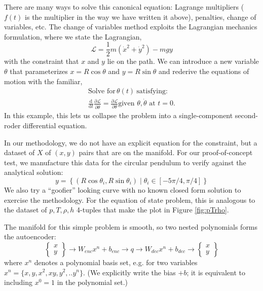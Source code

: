 \documentclass[]{article}
\begin{document}
There are many ways to solve this canonical equation: Lagrange
multipliers (\(f(t)\) is the multiplier in the way we have written it
above), penalties, change of variables, etc. The change of variables
method exploits the Lagrangian mechanics formulation, where we state
the Lagrangian,
\begin{equation}
\mathcal{L} = \frac{1}{2}m\left(\dot{x}^2 + \dot{y}^2\right) - m g y
\end{equation}
with the constraint that \(x\) and \(y\) lie on the path.
We can introduce a new variable \(\theta\) that parameterizes
\(x=R\cos\theta\) and \(y=R\sin\theta\) and rederive the equations of
motion with the familiar,
\begin{align}
\text{Solve for}\, \theta(t) \ \text{satisfying:} \nonumber \\
\frac{\mathrm{d}}{\mathrm{d}t} \frac{\partial \mathcal{L}}{\partial
  \dot{\theta}} =
  \frac{\partial \mathcal{L}}{\partial \theta}
   \text{given } \theta,\dot{\theta} \text{ at } t=0. \nonumber
\end{align}
In this example, this lets us collapse the problem into a
single-component second-roder differential equation.

In our methodology, we do not have an explicit equation for the
constraint, but a dataset of $X$ of $(x,y)$ pairs that are on the manifold. For
our proof-of-concept test, we manufacture this data for the circular
pendulum to verify against the analytical solution:
\begin{equation}
y = \left\{ (R\cos\theta_i, R\sin\theta_i)\; | \;\theta_i \in [-5\pi/4,\pi/4] \right\}
\end{equation}
We also try a ``goofier'' looking curve with no known closed form
solution to exercise the methodology.
For the equation of state problem, this is analogous to the dataset
of $p,T,\rho,h$ 4-tuples that make the plot in Figure \ref{fig:pTrho}.

The manifold for this simple problem is smooth, so two nested
polynomials forms the autoencoder:
\[\left\{\begin{array}{c} x\\y\end{array}\right\}
\rightarrow W_{enc} x^n +b_{enc}\rightarrow q \rightarrow W_{dec} x^n +b_{dec}\rightarrow 
\left\{\begin{array}{c} x\\y\end{array}\right\}\]
where $x^n$ denotes a polynomial basis set, e.g. for two variables $x^n=\{x,y,x^2,xy,y^2,..y^n\}$.
(We explicitly write the bias \(+b\); it is equivalent to including
\(x^0=1\) in the polynomial set.) 
\end{document}
